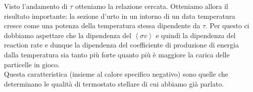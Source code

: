 Visto l'andamento di $\tau$ otteniamo la relazione cercata. Otteniamo allora il risultato importante: la sezione d'urto in un intorno di un data temperatura cresce come una potenza della temperatura stessa dipendente da $\tau$.
Per questo ci dobbiamo aspettare che la dipendenza del $\left<\sigma v\right>$  e quindi la dipendenza del reaction rate e dunque la dipendenza del coefficiente di produzione di energia dalla temperatura sia tanto più forte quanto più è maggiore la carica delle particelle in gioco.\\
Questa caratteristica (insieme al calore specifico negativo) sono quelle che determinano le qualità di termostato stellare di cui abbiamo già parlato.
